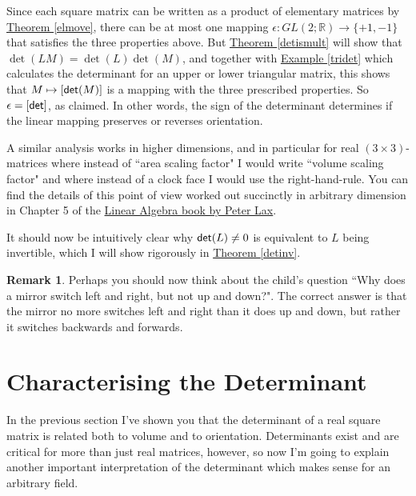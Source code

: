 \documentclass[11pt]{amsbook}
\theoremstyle{definition}
\newtheorem{rem}[theorem]{Remark}
\begin{document}
Since each square matrix can be written as a product of elementary matrices by \hyperref[elmove]{Theorem \ref{elmove}}, there can be at most one mapping $\epsilon:  GL(2; \mathbb{R}) \to \{ +1, -1\}$ that satisfies the three properties above. But \hyperref[detismult]{Theorem \ref{detismult}} will show that $\det (LM) = \det(L) \det (M)$, and together with \hyperref[tridet]{Example \ref{tridet}} which calculates the determinant for an upper or lower triangular matrix, this shows that $M\mapsto [{\sf det}(M)]$ is a mapping with the three prescribed properties. So $\epsilon  = [{\sf det }]$, as claimed. In other words, the sign of the determinant determines if the linear mapping preserves or reverses orientation.
\medskip

A similar analysis works in higher dimensions, and in particular for real $(3\times 3)$-matrices where instead of ``area scaling factor" I would write ``volume scaling factor" and where instead of a clock face I would use the right-hand-rule. You can find the details of this point of view worked out succinctly in arbitrary dimension in Chapter 5 of the \href{http://catalogue.lib.ed.ac.uk/vwebv/holdingsInfo?searchId=1244&recCount=10&recPointer=6&bibId=710930}{Linear Algebra book by Peter Lax}.

 It should now be intuitively clear why ${\sf det} (L) \neq 0$ is equivalent to $L$ being invertible, which I will show rigorously in \hyperref[detinv]{Theorem \ref{detinv}}.

\begin{rem}
Perhaps you should now think about the child's question ``Why does a mirror switch left and right, but not up and down?". The correct answer is that the mirror no more switches left and right than it does up and down, but rather it switches backwards and forwards.
\end{rem}

\section{Characterising the Determinant}
In the previous section I've shown you that the determinant of a real square matrix is related both to volume and to orientation. Determinants exist and are critical for more than just real matrices, however, so now I'm going to explain another important interpretation of the determinant which makes sense for an arbitrary field.
\end{document}
